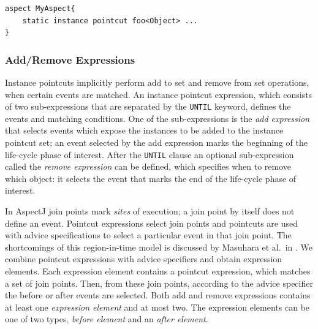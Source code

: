 \documentclass{acm_proc_article-sp}
\begin{document}
\begin{lstlisting}[float=h!, caption={An instance pointcut declaration in an aspect}, label={lst:member}]
aspect MyAspect{
	static instance pointcut foo<Object> ...
}
\end{lstlisting}

\subsubsection{Add/Remove Expressions}
Instance pointcuts implicitly perform add to set and remove from set operations, when certain events are matched. An instance pointcut expression, which consists of two sub-expressions that are separated by the \lstinline{UNTIL} keyword,  defines the events and matching conditions. One of the sub-expressions is the \emph{add expression} that selects events which expose the instances to be added to the instance pointcut set; an event selected by the add expression marks the beginning of the life-cycle phase of interest. After the \lstinline{UNTIL} clause an optional sub-expression called the \emph{remove expression} can be defined,  which specifies when to remove which object: it selects the event that marks the end of the life-cycle phase of interest. 

 
In AspectJ join points mark \emph{sites} of execution; a join point by itself does not define an event. 
Pointcut expressions select join points and pointcuts are used with advice specifications to select a particular event in that join point. The shortcomings of this region-in-time model is discussed by Masuhara et al.\ in \cite{masuharafine}.
We combine pointcut expressions with advice specifiers and obtain expression elements. Each expression element contains a pointcut expression, which matches a set of join points. Then, from these join points, according to the advice specifier the before or after events are selected.
Both add and remove expressions contains at least one \emph{expression element} and at most two.
The expression elements can be one of two types, \emph{before element} and an \emph{after element}.
\end{document}
